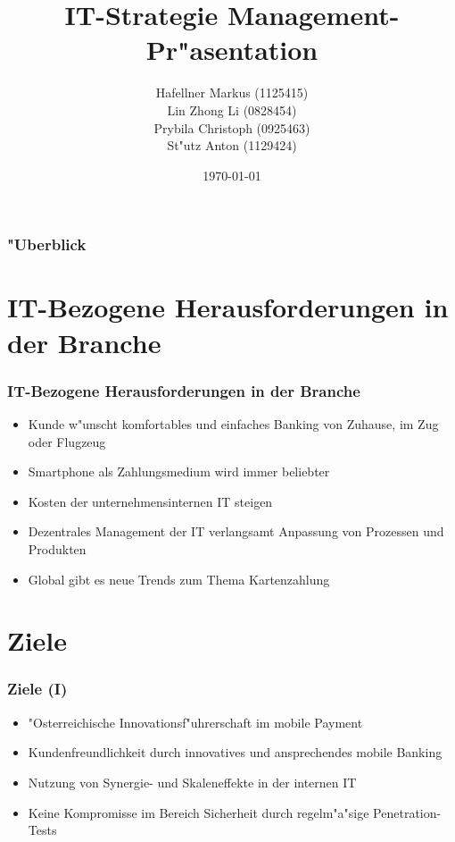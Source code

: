 \documentclass{beamer}
\title{IT-Strategie Management-Pr"asentation}
\author{ Hafellner Markus (1125415)\\
 Lin Zhong Li (0828454)\\
 Prybila Christoph (0925463)\\
 St"utz Anton (1129424)\\
}
\date{\today}
\begin{document}
\maketitle


\begin{frame}

  \frametitle{"Uberblick}
  
	\tableofcontents
\end{frame}

\section{IT-Bezogene Herausforderungen in der Branche}
\begin{frame}

  \frametitle{IT-Bezogene Herausforderungen in der Branche}
  \begin{itemize}

	\item Kunde w"unscht komfortables und einfaches Banking von Zuhause, im Zug oder Flugzeug\vspace{2mm}
	\item Smartphone als Zahlungsmedium wird immer beliebter\vspace{2mm}
	\item Kosten der unternehmensinternen IT steigen\vspace{2mm}
	\item Dezentrales Management der IT verlangsamt Anpassung von Prozessen und Produkten\vspace{2mm}
	\item Global gibt es neue Trends zum Thema Kartenzahlung

  \end{itemize}
\end{frame}

\section{Ziele}
\begin{frame}

  \frametitle{Ziele (I)}
  \begin{itemize}

	\item "Osterreichische Innovationsf"uhrerschaft im mobile Payment\vspace{2mm}
	\item Kundenfreundlichkeit durch innovatives und ansprechendes mobile Banking\vspace{2mm}
	\item Nutzung von Synergie- und Skaleneffekte in der internen IT\vspace{2mm}
	\item Keine Kompromisse im Bereich Sicherheit durch regelm"a"sige Penetration-Tests

  \end{itemize}
\end{frame}
\end{document}
